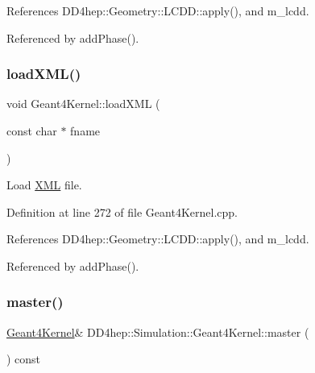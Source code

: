 References D\+D4hep\+::\+Geometry\+::\+L\+C\+D\+D\+::apply(), and m\+\_\+lcdd.



Referenced by add\+Phase().

\hypertarget{class_d_d4hep_1_1_simulation_1_1_geant4_kernel_aaaab733198f5e548e23c5b97dfd0aa32}{}\label{class_d_d4hep_1_1_simulation_1_1_geant4_kernel_aaaab733198f5e548e23c5b97dfd0aa32} 
\subsubsection{\texorpdfstring{load\+X\+M\+L()}{loadXML()}}
{\footnotesize\ttfamily void Geant4\+Kernel\+::load\+X\+ML (\begin{DoxyParamCaption}\item[{const char $\ast$}]{fname }\end{DoxyParamCaption})\hspace{0.3cm}{\ttfamily [virtual]}}



Load \hyperlink{namespace_d_d4hep_1_1_x_m_l}{X\+ML} file. 



Definition at line 272 of file Geant4\+Kernel.\+cpp.



References D\+D4hep\+::\+Geometry\+::\+L\+C\+D\+D\+::apply(), and m\+\_\+lcdd.



Referenced by add\+Phase().

\hypertarget{class_d_d4hep_1_1_simulation_1_1_geant4_kernel_ad717838179751e34f857c1108ae6607b}{}\label{class_d_d4hep_1_1_simulation_1_1_geant4_kernel_ad717838179751e34f857c1108ae6607b} 
\subsubsection{\texorpdfstring{master()}{master()}}
{\footnotesize\ttfamily \hyperlink{class_d_d4hep_1_1_simulation_1_1_geant4_kernel}{Geant4\+Kernel}\& D\+D4hep\+::\+Simulation\+::\+Geant4\+Kernel\+::master (\begin{DoxyParamCaption}{ }\end{DoxyParamCaption}) const\hspace{0.3cm}{\ttfamily [inline]}}




